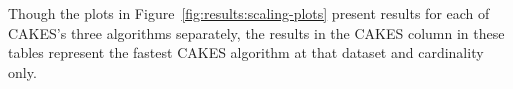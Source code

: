 Though the plots in Figure~\ref{fig:results:scaling-plots} present results for each of CAKES's three algorithms separately, the results in the CAKES column in these tables represent the fastest CAKES algorithm at that dataset and cardinality only.









